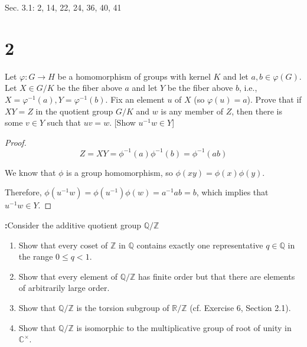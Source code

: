\documentclass[11pt]{article}
\newenvironment{exercise}[1]
	{\noindent \textbf{#1:}}
	{\par \vspace{0.5\baselineskip}}
\begin{document}


\begin{center}
\end{center}



Sec. 3.1: 2, 14, 22, 24, 36, 40, 41

\section*{2}

\textsf{Let \(\varphi: G \to H\) be a homomorphism of groups with kernel \(K\) and let \(a, b \in \varphi(G)\). Let \(X \in G/K\) be the fiber above \(a\) and let \(Y\) be the fiber above \(b\), i.e., \(X = \varphi^{-1}(a), Y = \varphi^{-1}(b)\). Fix an element \(u\) of \(X\) (so \(\varphi(u) = a\)). Prove that if \(XY = Z\) in the quotient group \(G/K\) and \(w\) is any member of \(Z\), then there is some \(v \in Y\) such that \(uv = w\). [Show \(u^{-1}w \in Y\)]}



\begin{proof}
	\[
		Z=XY=\phi^{-1}(a)\phi^{-1}(b) = \phi^{-1}(ab)
	\]

	We know that $\phi$ is a group homomorphism, so $\phi(xy)=\phi(x)\phi(y)$.

	Therefore, $\phi(u^{-1}w) = \phi(u^{-1})\phi(w) = a^{-1} ab=b$, which implies that $u^{-1}w \in Y$.
\end{proof}

\begin{exercise}{14}
	\textsf{Consider the additive quotient group \(\mathbb{Q}/\mathbb{Z}\)}
	\begin{enumerate}[label=\emph{\alph*}]
		\item \textsf{Show that every coset of \(\mathbb{Z}\) in \(\mathbb{Q}\) contains exactly one representative \(q \in \mathbb{Q}\) in the range \(0 \leqslant q < 1\).}
		\item \textsf{Show that every element of \(\mathbb{Q}/\mathbb{Z}\) has finite order but that there are elements of arbitrarily large order.}
		\item \textsf{Show that \(\mathbb{Q}/\mathbb{Z}\) is the torsion subgroup of \(\mathbb{R}/\mathbb{Z}\) (cf. Exercise 6, Section 2.1).}
		\item \textsf{Show that \(\mathbb{Q}/\mathbb{Z}\) is isomorphic to the multiplicative group of root of unity in \(\mathbb{C}^{\times}\).}
	\end{enumerate}
\end{exercise}{22}
\end{document}
